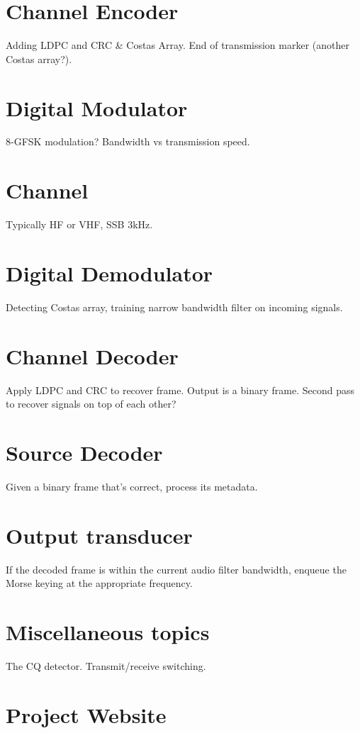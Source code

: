 \documentclass[a4paper]{tufte-handout}
\begin{document}
\section{Channel Encoder}
Adding LDPC and CRC \& Costas Array. End of transmission marker (another Costas array?).

\section{Digital Modulator}
8-GFSK modulation? Bandwidth vs transmission speed.

\section{Channel}
Typically HF or VHF, SSB 3kHz.

\section{Digital Demodulator}
Detecting Costas array, training narrow bandwidth filter on incoming signals. 

\section{Channel Decoder}
Apply LDPC and CRC to recover frame. Output is a binary frame.
Second pass to recover signals on top of each other?

\section{Source Decoder}
Given a binary frame that's correct, process its metadata.

\section{Output transducer}
If the decoded frame is within the current audio filter bandwidth, enqueue the Morse keying at the appropriate frequency.

\section{Miscellaneous topics}
The CQ detector. Transmit/receive switching.

\pagebreak
\section{Project Website}
\end{document}

